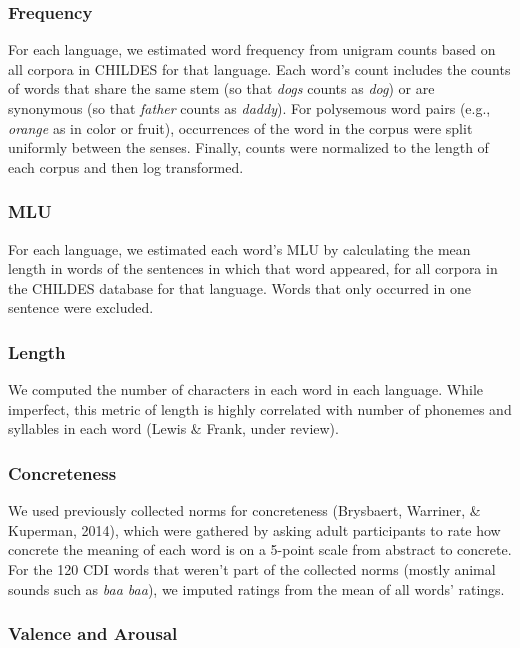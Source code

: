 \documentclass[10pt, letterpaper]{article}
\begin{document}
\subsubsection{Frequency}\label{frequency}

For each language, we estimated word frequency from unigram counts based
on all corpora in CHILDES for that language. Each word's count includes
the counts of words that share the same stem (so that \emph{dogs} counts
as \emph{dog}) or are synonymous (so that \emph{father} counts as
\emph{daddy}). For polysemous word pairs (e.g., \emph{orange} as in
color or fruit), occurrences of the word in the corpus were split
uniformly between the senses. Finally, counts were normalized to the
length of each corpus and then log transformed.

\subsubsection{MLU}\label{mlu}

For each language, we estimated each word's MLU by calculating the mean
length in words of the sentences in which that word appeared, for all
corpora in the CHILDES database for that language. Words that only
occurred in one sentence were excluded.

\subsubsection{Length}\label{length}

We computed the number of characters in each word in each language.
While imperfect, this metric of length is highly correlated with number
of phonemes and syllables in each word (Lewis \& Frank, under review).

\subsubsection{Concreteness}\label{concreteness}

We used previously collected norms for concreteness (Brysbaert,
Warriner, \& Kuperman, 2014), which were gathered by asking adult
participants to rate how concrete the meaning of each word is on a
5-point scale from abstract to concrete. For the 120 CDI words that
weren't part of the collected norms (mostly animal sounds such as
\emph{baa baa}), we imputed ratings from the mean of all words' ratings.

\subsubsection{Valence and Arousal}\label{valence-and-arousal}
\end{document}
